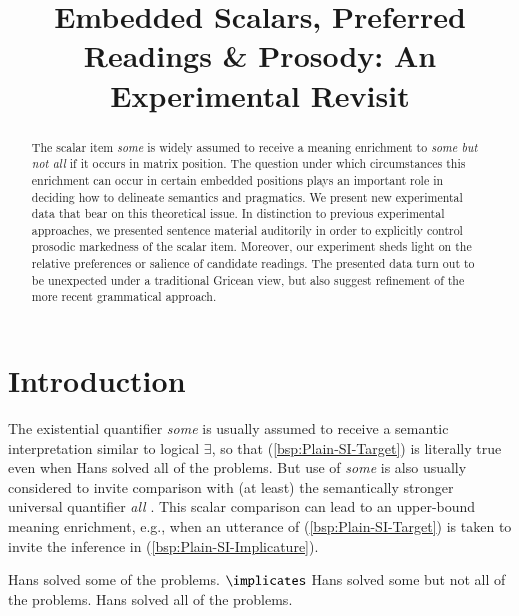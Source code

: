 \documentclass[fleqn,reqno,10pt]{article}
\title{Embedded Scalars, Preferred Readings \& Prosody: {A}n
  Experimental Revisit}
\author{%
}
\date{}
\begin{document}
\maketitle



\begin{abstract}
  The scalar item \emph{some} is widely assumed to receive a meaning
  enrichment to \emph{some but not all} if it occurs in matrix
  position. The question under which circumstances this enrichment can
  occur in certain embedded positions plays an important role in
  deciding how to delineate semantics and pragmatics. %
  We present new experimental data that bear on this theoretical
  issue. In distinction to previous experimental approaches, we
  presented sentence material auditorily in order to explicitly
  control prosodic markedness of the scalar item. Moreover, our
  experiment sheds light on the relative preferences or salience of
  candidate readings. The presented data turn out to be unexpected
  under a traditional Gricean view, but also suggest refinement of the
  more recent grammatical approach.
\end{abstract}




\section{Introduction}
\label{sec:introduction}

The existential quantifier \emph{some} is usually assumed to receive a
semantic interpretation similar to logical $\exists$, so that
(\ref{bsp:Plain-SI-Target}) is literally true even when Hans solved
all of the problems. But use of \emph{some} is also usually considered
to invite comparison with (at least) the semantically stronger
universal quantifier \emph{all}
\citep[c.f.][]{Horn1972:On-the-Semantic,Gazdar1979:Pragmatics:-Imp,AtlasLevinson1981}. This
scalar comparison can lead to an upper-bound meaning enrichment, e.g.,
when an utterance of (\ref{bsp:Plain-SI-Target}) is taken to invite
the inference in (\ref{bsp:Plain-SI-Implicature}).

\begin{exe}
  \ex \label{bsp:Plain-SI}
    \begin{xlist}
      \ex \label{bsp:Plain-SI-Target} Hans solved some of the
        problems.
      \ex \label{bsp:Plain-SI-Implicature} $\implicates$ Hans solved
        some but not all of the problems.
      \ex \label{bsp:Plain-SI-Alternative} Hans solved all of the problems.
    \end{xlist}
\end{exe}
\end{document}

